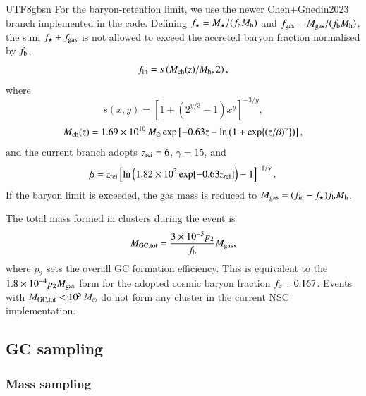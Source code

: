 \documentclass[trackchanges, twocolappendix, twocolumn]{aastex701}
\begin{document}
\begin{CJK*}{UTF8}{gbsn}
For the baryon-retention limit, we use the newer Chen+Gnedin2023 branch implemented in the code. Defining \(f_{\star}=M_{\star}/(f_{\rm b}M_{\rm h})\) and \(f_{\rm gas}=M_{\rm gas}/(f_{\rm b}M_{\rm h})\), the sum \(f_{\star}+f_{\rm gas}\) is not allowed to exceed the accreted baryon fraction normalised by \(f_{\rm b}\),
\begin{equation}
f_{\rm in}=s\left(M_{\rm ch}(z)/M_{\rm h},2\right),
\end{equation}
where
\begin{equation}
s(x,y)=\left[1+\left(2^{y/3}-1\right)x^y\right]^{-3/y},
\end{equation}
\begin{equation}
M_{\rm ch}(z)=1.69\times10^{10}\,M_{\odot}
\exp\left[-0.63z-\ln\left(1+\exp\{(z/\beta)^{\gamma}\}\right)\right],
\end{equation}
and the current branch adopts \(z_{\rm rei}=6\), \(\gamma=15\), and
\begin{equation}
\beta=z_{\rm rei}
\left[\ln\left(1.82\times10^3\exp[-0.63z_{\rm rei}]\right)-1\right]^{-1/\gamma}.
\end{equation}
If the baryon limit is exceeded, the gas mass is reduced to \(M_{\rm gas}=(f_{\rm in}-f_{\star})f_{\rm b}M_{\rm h}\).

The total mass formed in clusters during the event is
\begin{equation}
M_{\rm GC,tot}=\frac{3\times10^{-5}p_2}{f_{\rm b}}M_{\rm gas},
\label{eq:gc_total_mass}
\end{equation}
where \(p_2\) sets the overall GC formation efficiency. This is equivalent to the \(1.8\times10^{-4}p_2M_{\rm gas}\) form for the adopted cosmic baryon fraction \(f_{\rm b}=0.167\). Events with \(M_{\rm GC,tot}<10^5\,M_{\odot}\) do not form any cluster in the current NSC implementation.

\subsection{GC sampling} \label{subsect:gc_sampling}

\subsubsection{Mass sampling} \label{subsubsect:mass_sampling}


\end{CJK*}
\end{document}
